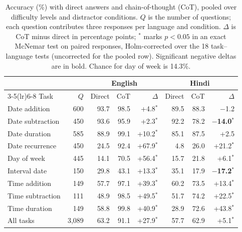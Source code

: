 \begin{table}[t]
\centering
\begin{tabular}{lrrrrrrr}
\toprule
 & & \multicolumn{3}{c}{English} & \multicolumn{3}{c}{Hindi} \\
\cmidrule(lr){3-5}\cmidrule(lr){6-8}
Task & $Q$ & Direct & CoT & $\Delta$ & Direct & CoT & $\Delta$ \\
\midrule
Date addition & 600 & 93.7 & 98.5 & +4.8$^{*}$ & 89.5 & 88.3 & $-$1.2\phantom{$^{*}$} \\
Date subtraction & 450 & 93.6 & 95.9 & +2.3$^{*}$ & 92.2 & 78.2 & \textbf{$-$14.0$^{*}$} \\
Date duration & 585 & 88.9 & 99.1 & +10.2$^{*}$ & 85.1 & 87.5 & +2.5\phantom{$^{*}$} \\
Date recurrence & 450 & 24.5 & 92.4 & +67.9$^{*}$ & 4.8 & 26.0 & +21.2$^{*}$ \\
Day of week & 445 & 14.1 & 70.5 & +56.4$^{*}$ & 15.7 & 21.8 & +6.1$^{*}$ \\
Interval date & 150 & 29.8 & 43.1 & +13.3$^{*}$ & 35.1 & 17.9 & \textbf{$-$17.2$^{*}$} \\
Time addition & 149 & 57.7 & 97.1 & +39.3$^{*}$ & 60.2 & 73.5 & +13.4$^{*}$ \\
Time subtraction & 111 & 48.9 & 98.5 & +49.5$^{*}$ & 51.7 & 74.2 & +22.5$^{*}$ \\
Time duration & 149 & 58.8 & 99.8 & +40.9$^{*}$ & 28.9 & 72.6 & +43.8$^{*}$ \\
\midrule
All tasks & 3,089 & 63.2 & 91.1 & +27.9$^{*}$ & 57.7 & 62.9 & +5.1$^{*}$ \\
\bottomrule
\end{tabular}
\caption{Accuracy (\%) with direct answers and chain-of-thought (CoT), pooled over difficulty levels and distractor conditions. $Q$ is the number of questions; each question contributes three responses per language and condition. $\Delta$ is CoT minus direct in percentage points; $^{*}$ marks $p<0.05$ in an exact McNemar test on paired responses, Holm-corrected over the 18 task--language tests (uncorrected for the pooled row). Significant negative deltas are in bold. Chance for day of week is 14.3\%.}
\label{tab:cot-delta}
\end{table}
